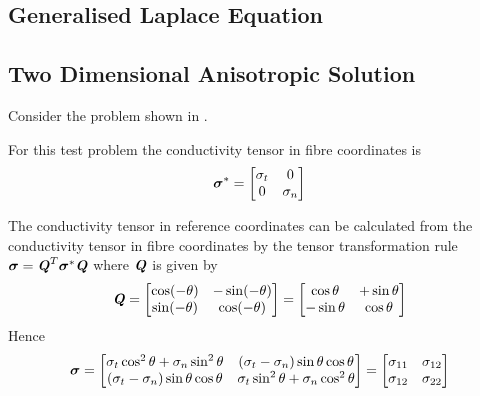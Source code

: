 \subsection{Generalised Laplace Equation} 

\subsection{Two Dimensional Anisotropic Solution}

Consider the problem shown in .



For this test problem the conductivity tensor in fibre coordinates is
\begin{equation}
  \boldsymbol{\mathit{\sigma}}^{*}=\begin{bmatrix}
    \sigma_{t} & 0 \\ 
    0 & \sigma_{n}
  \end{bmatrix}
\end{equation}

The conductivity tensor in  reference coordinates can be calculated from the
conductivity tensor in  fibre coordinates by the tensor transformation rule
$\boldsymbol{\mathit{\sigma}}={\boldsymbol{\mathit{Q}}}^{T}\boldsymbol{\mathit{\sigma}}^{*}\boldsymbol{\mathit{Q}}$ where
$\boldsymbol{\mathit{Q}}$ is given by
\begin{equation}
  \boldsymbol{\mathit{Q}}=\begin{bmatrix}
    \cos(-\theta) & -\sin(-\theta) \\
    \sin(-\theta) & \cos(-\theta)
  \end{bmatrix} = \begin{bmatrix}
    \cos\theta & +\sin\theta \\
    -\sin\theta & \cos\theta
  \end{bmatrix}
\end{equation}
Hence
\begin{equation}
  \tensor{\sigma}=\begin{bmatrix}
    \sigma_{t}\cos^{2}\theta+\sigma_{n}\sin^{2}\theta & 
    \pbrac{\sigma_{t}-\sigma_{n}}\sin\theta\cos\theta \\
    \pbrac{\sigma_{t}-\sigma_{n}}\sin\theta\cos\theta &
    \sigma_{t}\sin^{2}\theta+\sigma_{n}\cos^{2}\theta
  \end{bmatrix} = \begin{bmatrix}
    \sigma_{11} & \sigma_{12} \\
    \sigma_{12} & \sigma_{22} 
  \end{bmatrix}
  \label{eqn:conductivtytransformation}
\end{equation}


